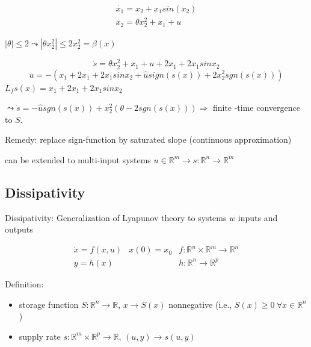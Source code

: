 \begin{Example}
\begin{equation*}
\begin{array}{l}
     \dot{x_1} = x_2 + x_1 sin(x_2)\\
     \dot{x_2} = \theta x_2^2 + x_1 + u
\end{array}
\end{equation*}

$|\theta| \leq 2 \leadsto |\theta x_2^2| \leq 2x_2^2 = \beta(x)$

\begin{equation*}
\dot{s} = \theta x_2^2 + x_1 +u +2x_1 +2x_1sinx_2
\end{equation*}
\begin{equation*}
u = -(x_1 +2x_1 +2x_1sinx_2 + \hat{u}sign(s(x)) + 2x_2^2sgn(s(x)))
\end{equation*}
$L_fs(x) = x_1 +2x_1 +2x_1sinx_2$

$\leadsto \dot{s} = - \hat{u}sgn(s(x)) + x_2^2(\theta - 2sgn(s(x))) \Rightarrow$ finite -time convergence to $S$.
\end{Example}

Remedy: replace sign-function by saturated slope (continuous approximation)

can be extended to multi-input systems $u \in \mathbb{R}^m \to s: \mathbb{R}^n \to \mathbb{R}^m$

\subsection{Dissipativity}

Dissipativity: Generalization of Lyapunov theory to systems $w$ inputs and outputs

\begin{equation}\label{input-output}
\begin{array}{lll}
     \dot{x} = f(x,u) & x(0) = x_0 & f: \mathbb{R}^n \times \mathbb{R}^m \to \mathbb{R}^n \\
     y = h(x) & & h: \mathbb{R}^n \to \mathbb{R}^p
\end{array}
\end{equation}

Definition: 
\begin{itemize}
\item storage function $S: \mathbb{R}^n \to \mathbb{R}$, $x \to S(x)$ nonnegative (i.e., $S(x) \geq 0 \ \forall x \in \mathbb{R}^n$)
\item supply rate $s: \mathbb{R}^m \times \mathbb{R}^p \to \mathbb{R}$, $(u,y) \to s(u,y)$
\end{itemize}

